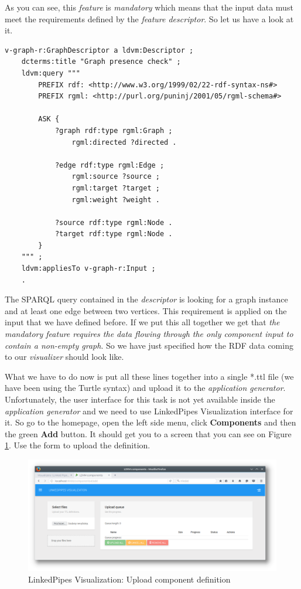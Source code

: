 As you can see, this \emph{feature} is \emph{mandatory} which means that the input data must meet the requirements defined by the \emph{feature descriptor}. So let us have a look at it.

\scriptsize
\begin{verbatim}
v-graph-r:GraphDescriptor a ldvm:Descriptor ;
    dcterms:title "Graph presence check" ;
    ldvm:query """
        PREFIX rdf: <http://www.w3.org/1999/02/22-rdf-syntax-ns#>
        PREFIX rgml: <http://purl.org/puninj/2001/05/rgml-schema#>

        ASK {
            ?graph rdf:type rgml:Graph ;
                rgml:directed ?directed .

            ?edge rdf:type rgml:Edge ;
                rgml:source ?source ;
                rgml:target ?target ;
                rgml:weight ?weight .

            ?source rdf:type rgml:Node .
            ?target rdf:type rgml:Node .
        }
    """ ;
    ldvm:appliesTo v-graph-r:Input ;
    .
\end{verbatim}
\normalsize

The SPARQL query contained in the \emph{descriptor} is looking for a graph instance and at least one edge between two vertices. This requirement is applied on the input that we have defined before. If we put this all together we get that \textit{the \emph{mandatory feature} requires the data flowing through the only \emph{component input} to contain a non-empty graph}. So we have just specified how the RDF data coming to our \emph{visualizer} should look like.

What we have to do now is put all these lines together into a single *.ttl file (we have been using the Turtle syntax) and upload it to the \emph{application generator}. Unfortunately, the user interface for this task is not yet available inside the \emph{application generator} and we need to use LinkedPipes Visualization interface for it. So go to the homepage, open the left side menu, click \textbf{Components} and then the green \textbf{Add} button. It should get you to a screen that you can see on Figure \ref{fig:upload_component_definition}. Use the form to upload the definition.

\begin{figure}
	\centering
	\includegraphics[width=145mm]{img/05_upload_component_definition.png}
	\caption{LinkedPipes Visualization: Upload component definition}
    \label{fig:upload_component_definition}
\end{figure}

